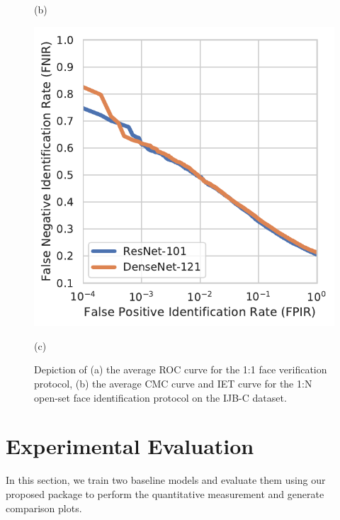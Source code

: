 \documentclass{article}
\begin{document}
\begin{figure}[htb]
\begin{minipage}[b]{0.33\linewidth}
  \centerline{(b)}\medskip
\end{minipage}
\begin{minipage}[b]{0.33\linewidth}
  \centering
  \centerline{\includegraphics[width=\linewidth]{FaRE-IJB-C-IET}}
  \centerline{(c)}\medskip
\end{minipage}
\vspace{-2em}
\caption{Depiction of (a) the average ROC curve for the 1:1 face verification protocol, (b) the average CMC curve and IET curve for the 1:N open-set face identification protocol on the IJB-C dataset.}
\label{FIG:FaRE-IJB-C}
\end{figure}

\section{Experimental Evaluation}
\label{SEC:FaRE-EXP}
In this section, we train two baseline models and evaluate them using our proposed package to perform the quantitative measurement and generate comparison plots.
\end{document}
